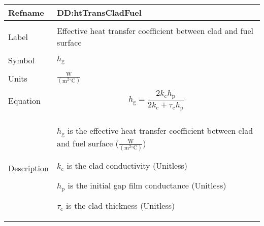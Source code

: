 \documentclass[12pt]{article}
\begin{document}
\vspace{\baselineskip}
\noindent
\begin{minipage}{\textwidth}
\begin{tabular}{>{\raggedright}p{}>{\raggedright\arraybackslash}p{}}
\toprule \textbf{Refname} & \textbf{DD:htTransCladFuel}
\label{DD:htTransCladFuel}
\\ \midrule \\
Label & Effective heat transfer coefficient between clad and fuel surface
        
\\ \midrule \\
Symbol & ${h_{\text{g}}}$
         
\\ \midrule \\
Units & $\frac{\text{W}}{(\text{m}^{2}{}^{\circ}\text{C})}$
        
\\ \midrule \\
Equation & \begin{displaymath}
           {h_{\text{g}}}=\frac{2 {k_{\text{c}}} {h_{\text{p}}}}{2 {k_{\text{c}}}+{τ_{\text{c}}} {h_{\text{p}}}}
           \end{displaymath}
\\ \midrule \\
Description & \begin{symbDescription}
              \item{${h_{\text{g}}}$ is the effective heat transfer coefficient between clad and fuel surface ($\frac{\text{W}}{(\text{m}^{2}{}^{\circ}\text{C})}$)}
              \item{${k_{\text{c}}}$ is the clad conductivity (Unitless)}
              \item{${h_{\text{p}}}$ is the initial gap film conductance (Unitless)}
              \item{${τ_{\text{c}}}$ is the clad thickness (Unitless)}
              \end{symbDescription}
\\ \bottomrule
\end{tabular}
\end{minipage}
\vspace{\baselineskip}
\noindent
\end{document}
